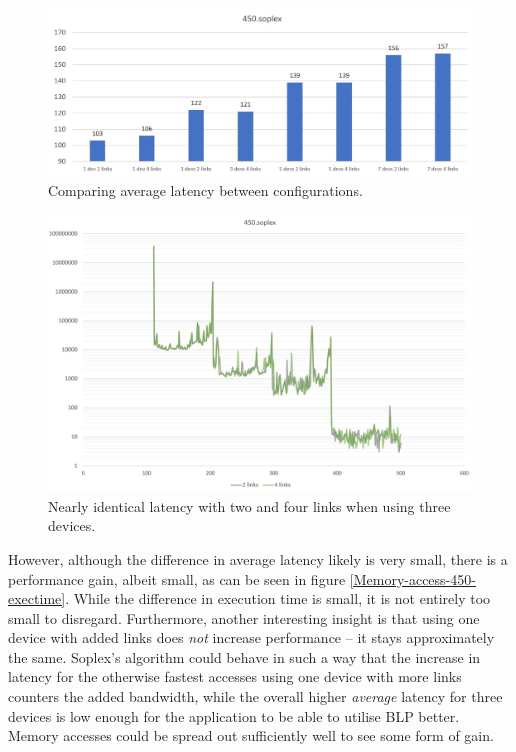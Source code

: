 \begin{figure}[!ht]
    \centering
    \includegraphics[width=1.0\linewidth]{figure/450-averages.jpg}
    \caption{Comparing average latency between configurations.}
    \label{Memory-access-450-average-latency}
\end{figure}

\begin{figure}[!ht]
    \centering
    \includegraphics[width=1.0\linewidth]{figure/450-4_4-8.jpg}
    \caption{Nearly identical latency with two and four links when using three devices.}
    \label{Memory-access-450-4-dev-4-8-links}
\end{figure}

However, although the difference in average latency likely is very small, there is a performance gain, albeit small, as can be seen in figure \ref{Memory-access-450-exectime}. While the difference in execution time is small, it is not entirely too small to disregard. Furthermore, another interesting insight is that using one device with added links does \emph{not} increase performance -- it stays approximately the same. Soplex's algorithm could behave in such a way that the increase in latency for the otherwise fastest accesses using one device with more links counters the added bandwidth, while the overall higher \emph{average} latency for three devices is low enough for the application to be able to utilise BLP better. Memory accesses could be spread out sufficiently well to see some form of gain.
\bigskip

